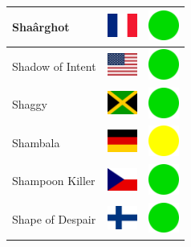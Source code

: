 \documentclass[12pt, a4paper, twoside]{report}
\begin{document}
\begin{center}
\begin{longtable}{|p{5cm}|p{2cm}|p{2cm}|}
 Shaârghot                                                  & \includegraphics[width=1cm]{../img/flags/fr} &   \includegraphics[width=1cm]{../likes/y} \\ \hline
 Shadow of Intent                                           & \includegraphics[width=1cm]{../img/flags/us} &   \includegraphics[width=1cm]{../likes/y} \\ \hline
 Shaggy                                                     & \includegraphics[width=1cm]{../img/flags/jm} &   \includegraphics[width=1cm]{../likes/y} \\ \hline
 Shambala                                                   & \includegraphics[width=1cm]{../img/flags/de} &   \includegraphics[width=1cm]{../likes/m} \\ \hline
 Shampoon Killer                                            & \includegraphics[width=1cm]{../img/flags/cz} &   \includegraphics[width=1cm]{../likes/y} \\ \hline
 Shape of Despair                                           & \includegraphics[width=1cm]{../img/flags/fi} &   \includegraphics[width=1cm]{../likes/y} \\ \hline

\end{longtable}
\end{center}
\end{document}
